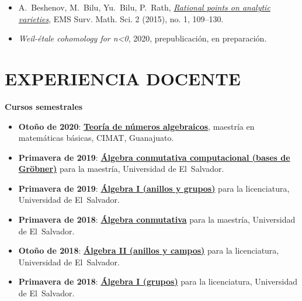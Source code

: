 \documentclass{article}
\begin{document}
\begin{itemize}
\item A.~Beshenov, M.~Bilu, Yu.~Bilu, P.~Rath,
  \emph{\href{https://arxiv.org/abs/1408.1441}{Rational points on analytic varieties}},
  EMS Surv. Math. Sci. 2 (2015), no. 1, 109–130.

\item \emph{Weil-étale cohomology for n<0}, 2020, prepublicación,
  en preparación.
\end{itemize}

\pagebreak

{\color{RoyalBlue}\section*{EXPERIENCIA DOCENTE}}

\noindent\textbf{Cursos semestrales}

\vspace{0.5em}

\begin{itemize}
\item \textbf{Otoño de 2020}:
  \href{https://cadadr.org/cimat-tna/}{\textbf{Teoría de números algebraicos}},
  maestría en matemáticas básicas, CIMAT, Guanajuato.

\item \textbf{Primavera de 2019}:
  \href{https://cadadr.org/san-salvador/2019-groebner/}{\textbf{Álgebra conmutativa computacional (bases de Gröbner)}}
  para la maestría, Universidad de El~Salvador.

\item \textbf{Primavera de 2019}:
  \href{https://cadadr.org/san-salvador/2019-algebra/}{\textbf{Álgebra I (anillos y grupos)}}
  para la licenciatura, Universidad de El~Salvador.

\item \textbf{Primavera de 2018}:
  \href{https://cadadr.org/san-salvador/2018-08-algebra-conmutativa/}{\textbf{Álgebra conmutativa}}
  para la maestría, Universidad de El~Salvador.

\item \textbf{Otoño de 2018}:
  \href{https://cadadr.org/san-salvador/2018-algebra/}{\textbf{Álgebra II (anillos y campos)}}
  para la licenciatura, Universidad de El~Salvador.

\item \textbf{Primavera de 2018}:
  \href{https://cadadr.org/san-salvador/2018-algebra/}{\textbf{Álgebra I (grupos)}}
  para la licenciatura, Universidad de El~Salvador.
\end{itemize}
\end{document}
